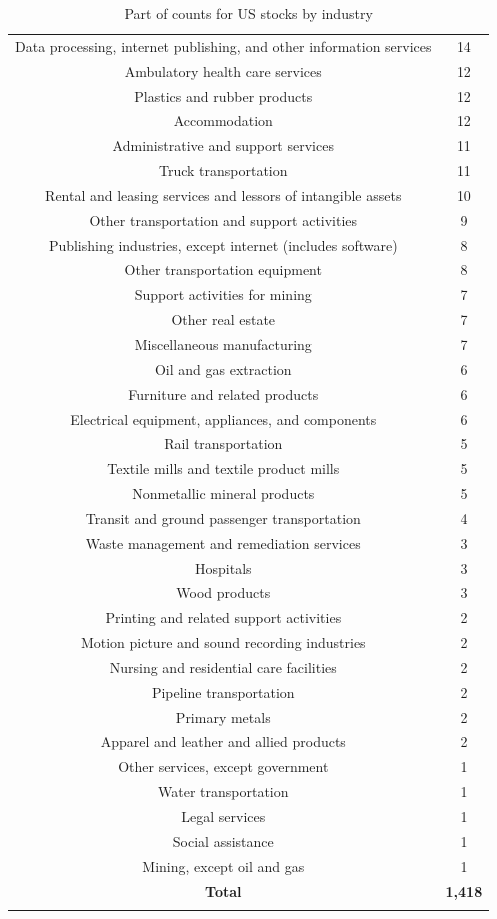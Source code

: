\begin{longtable}{c|c}
	Data processing, internet publishing, and other information services & 14 \\
	Ambulatory health care services & 12 \\
	Plastics and rubber products & 12 \\
	Accommodation & 12 \\
	Administrative and support services & 11 \\
	Truck transportation & 11 \\
	Rental and leasing services and lessors of intangible assets & 10 \\
	Other transportation and support activities & 9 \\
	Publishing industries, except internet (includes software) & 8 \\
	Other transportation equipment & 8 \\
	Support activities for mining & 7 \\
	Other real estate & 7 \\
	Miscellaneous manufacturing & 7 \\
	Oil and gas extraction	& 6 \\
	Furniture and related products & 6 \\
	Electrical equipment, appliances, and components & 6 \\
	Rail transportation & 5 \\
	Textile mills and textile product mills & 5 \\
	Nonmetallic mineral products & 5 \\
	Transit and ground passenger transportation & 4 \\
	Waste management and remediation services & 3 \\
	Hospitals & 3 \\
	Wood products & 3 \\
	Printing and related support activities & 2 \\
	Motion picture and sound recording industries & 2 \\
	Nursing and residential care facilities & 2 \\
	Pipeline transportation & 2 \\
	Primary metals & 2 \\
	Apparel and leather and allied products & 2 \\
	Other services, except government & 1 \\
	Water transportation & 1 \\
	Legal services & 1 \\
	Social assistance & 1 \\
	Mining, except oil and gas & 1 \\
	\textbf{Total} & \textbf{1,418} \\
	\caption{Part of counts for US stocks by industry \cite{secwebsite}}
	\label{tab:industrytable}
\end{longtable}

